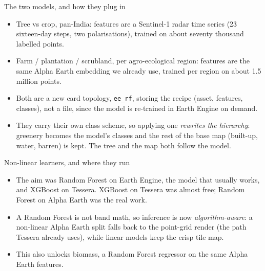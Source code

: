\documentclass[aspectratio=169]{beamer}
\begin{document}
\begin{frame}{The two models, and how they plug in}
\begin{itemize}\small
  \item Tree vs crop, pan-India: features are a Sentinel-1 radar time series (23 sixteen-day steps,
  two polarisations), trained on about seventy thousand labelled points.
  \item Farm / plantation / scrubland, per agro-ecological region: features are the same Alpha Earth
  embedding we already use, trained per region on about 1.5 million points.
  \item Both are a new card topology, \texttt{ee\_rf}, storing the recipe (asset, features, classes),
  not a file, since the model is re-trained in Earth Engine on demand.
  \item They carry their own class scheme, so applying one \emph{rewrites the hierarchy}: greenery
  becomes the model's classes and the rest of the base map (built-up, water, barren) is kept. The tree
  and the map both follow the model.
\end{itemize}
\end{frame}

\begin{frame}{Non-linear learners, and where they run}
\begin{itemize}
  \item The aim was Random Forest on Earth Engine, the model that usually works, and XGBoost on
  Tessera. XGBoost on Tessera was almost free; Random Forest on Alpha Earth was the real work.
  \item A Random Forest is not band math, so inference is now \emph{algorithm-aware}: a non-linear
  Alpha Earth split falls back to the point-grid render (the path Tessera already uses), while linear
  models keep the crisp tile map.
  \item This also unlocks biomass, a Random Forest regressor on the same Alpha Earth features.
\end{itemize}
\end{frame}
\end{document}
